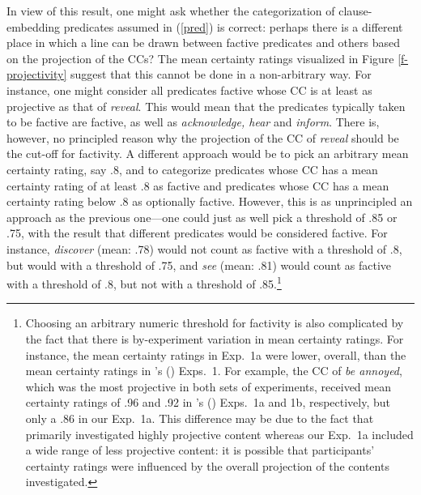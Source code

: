 \documentclass[11pt,fleqn]{article}
\newcommand{\6}{\mbox{$[\hspace*{-.6mm}[$}}
\newcommand{\9}{\mbox{$]\hspace*{-.6mm}]$}}
\newcommand{\citetpos}[1]{\citeauthor{#1}'s (\citeyear{#1})}
\begin{document}
In view of this result, one might ask whether the categorization of clause-embedding predicates assumed in (\ref{pred}) is correct: perhaps there is a different place in which a line can be drawn between factive predicates and others based on the projection of the CCs? The mean certainty ratings visualized in Figure \ref{f-projectivity} suggest that this cannot be done in a non-arbitrary way. For instance, one might consider all predicates factive whose CC is at least as projective as that of {\em reveal}. This would mean that the predicates typically taken to be factive are factive, as well as {\em acknowledge, hear} and {\em inform}. There is, however, no principled reason why the projection of the CC of {\em reveal} should be the cut-off for factivity. A different approach would be to pick an arbitrary mean certainty rating, say .8, and to categorize predicates whose CC has a mean certainty rating of at least .8 as factive and predicates whose CC has a mean certainty rating below .8 as optionally factive. However, this is as unprincipled an approach as the previous one---one could just as well pick a threshold of .85 or .75, with the result that different predicates would be considered factive. For instance, {\em discover} (mean: .78) would not count as factive with a threshold of .8, but would with a threshold of .75, and {\em see} (mean: .81) would count as factive with a threshold of .8, but not with a threshold of .85.\footnote{Choosing an arbitrary numeric threshold for factivity is also complicated by the fact that there is by-experiment variation in mean certainty ratings. For instance, the mean certainty ratings in Exp.~1a were lower, overall, than the mean certainty ratings in \citetpos{tbd-variability} Exps.~1. For example, the CC of {\em be annoyed}, which was the most projective in both sets of experiments, received mean certainty ratings of .96  and .92 in \citetpos{tbd-variability} Exps.~1a and 1b, respectively, but only a .86 in our Exp.~1a. This difference may be due to the fact that \citet{tbd-variability} primarily investigated highly projective content whereas our Exp.~1a included a wide range of less projective content: it is possible that participants' certainty ratings were influenced by the overall projection of the contents investigated.}
\end{document}
